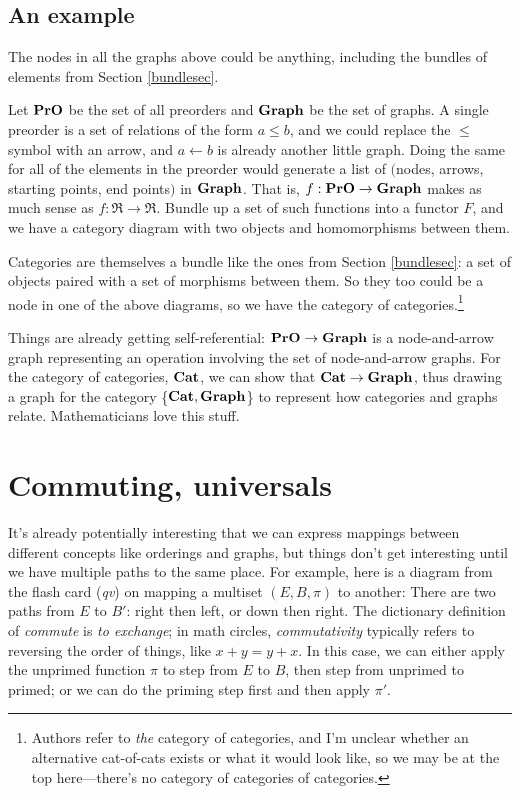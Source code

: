 \documentclass[11pt]{article}
\begin{document}
\subsection{An example}
The nodes in all the graphs above could be anything, including the bundles of elements from
Section \ref{bundlesec}.

Let ${\bf PrO}$ be the set of all preorders and ${\bf Graph}$ be the set of graphs. A
single preorder is a set of relations of the form $a \leq b$, and we could replace the $\leq$
symbol with an arrow, and $a\leftarrow b$ is already another little graph. 
Doing the same for all of the elements in the preorder would generate a list of
$($nodes, arrows, starting points, end points$)$ in ${\bf Graph}$.
That is, $f:{\bf PrO}\to {\bf Graph}$ makes as much sense as $f:\Re \to \Re$. Bundle up
a set of such functions into a functor $F$, and we have a category diagram with two
objects and homomorphisms between them.

Categories are themselves a bundle like the ones from Section \ref{bundlesec}: a set
of objects paired with a set of morphisms between them. So they too could be a node in
one of the above diagrams, so we have the category of categories.\footnote{Authors refer
to {\em the} category of categories, and I'm unclear whether an alternative cat-of-cats
exists or what it would look like, so we may be at the top here---there's no category of
categories of categories.}

Things are already getting self-referential: ${\bf PrO}\to {\bf Graph}$ is a node-and-arrow
graph representing an operation involving the set of node-and-arrow graphs. For the 
category of categories, ${\bf Cat}$, we can show that ${\bf Cat}\to {\bf Graph}$, thus
drawing a graph for the category \{${\bf Cat}, {\bf Graph}$\} to represent how categories and graphs relate.
Mathematicians love this stuff.

\section{Commuting, universals} It's already potentially interesting that we can
express mappings between different concepts like orderings and graphs, but things don't get
interesting until we have multiple paths to the same place. For example, here is a diagram
from the flash card ({\em qv}) on mapping a multiset $(E, B, \pi)$ to another:
There are two paths from $E$ to $B'$: right then left, or down then right.
The dictionary definition of {\em
commute} is {\em to exchange}; in math circles, {\em commutativity} typically refers to
reversing the order of things, like $x+y = y+x$. In this case, we can either apply the
unprimed function $\pi$ to step from $E$ to $B$, then step from unprimed to primed; or we can
do the priming step first and then apply $\pi'$.
\end{document}
